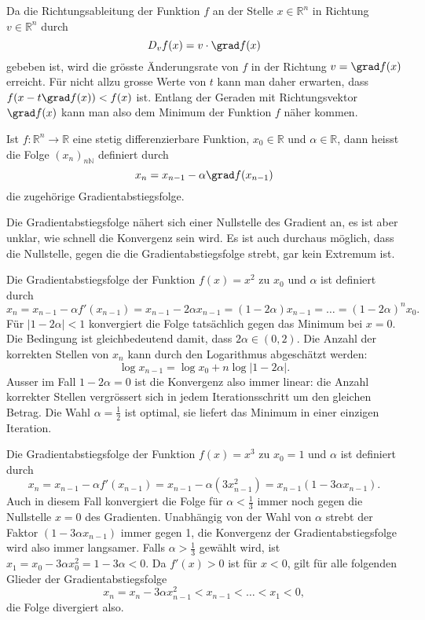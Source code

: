 Da die Richtungsableitung der Funktion $f$ an der Stelle $x\in\mathbb{R}^n$
in Richtung $v\in\mathbb{R}^n$ durch
\[
D_vf(x)
=
v\cdot \grad f(x)
\]
gebeben ist, wird die grösste Änderungsrate von $f$ in der Richtung
$v=\grad f(x)$ erreicht.
Für nicht allzu grosse Werte von $t$ kann man daher erwarten, dass
\(
f(x-t\grad f(x))
<
f(x)
\)
ist.
Entlang der Geraden mit Richtungsvektor $\grad f(x)$ kann man also
dem Minimum der Funktion $f$ näher kommen.

\begin{definition}[Gradientabstieg]
Ist $f\colon\mathbb{R}^n\to\mathbb{R}$ eine stetig differenzierbare
Funktion, $x_0\in\mathbb{R}$ und $\alpha\in\mathbb{R}$, dann heisst
die Folge $(x_n)_{n\mathbb{N}}$ definiert durch
\[
x_n = x_{n-1} - \alpha \grad f(x_{n-1})
\]
die zugehörige Gradientabstiegsfolge.
\end{definition}

Die Gradientabstiegsfolge nähert sich einer Nullstelle des Gradient
an, es ist aber unklar, wie schnell die Konvergenz sein wird.
Es ist auch durchaus möglich, dass die Nullstelle, gegen die die
Gradientabstiegsfolge strebt, gar kein Extremum ist.

\begin{beispiel}
Die Gradientabstiegsfolge der Funktion $f(x)=x^2$ zu $x_0$ und $\alpha$ ist
definiert durch
\[
x_n
=
x_{n-1}  -\alpha f'(x_{n-1})
=
x_{n-1}  -2\alpha x_{n-1}
=
(1-2\alpha)x_{n-1}
=
\dots
=
(1-2\alpha)^n x_0.
\]
Für $|1-2\alpha|< 1$ konvergiert die Folge tatsächlich gegen das
Minimum bei $x=0$.
Die Bedingung ist gleichbedeutend damit, dass $2\alpha\in(0,2)$.
Die Anzahl der korrekten Stellen von $x_n$ kann durch den
Logarithmus abgeschätzt werden:
\[
\log x_{n-1}
=
\log x_0 + n \log|1-2\alpha|.
\]
Ausser im Fall $1-2\alpha=0$ ist die Konvergenz also immer linear:
die Anzahl korrekter Stellen vergrössert sich in jedem Iterationsschritt
um den gleichen Betrag.
Die Wahl $\alpha = \frac12$ ist optimal, sie liefert das Minimum in
einer einzigen Iteration.
\end{beispiel}

\begin{beispiel}
Die Gradientabstiegsfolge der Funktion $f(x)=x^3$ zu $x_0=1$ und $\alpha$
ist definiert durch
\[
x_n
=
x_{n-1} - \alpha f'(x_{n-1})
=
x_{n-1} - \alpha (3x_{n-1}^2)
=
x_{n-1}(1-3\alpha x_{n-1}).
\]
Auch in diesem Fall konvergiert die Folge für $\alpha < \frac13$ immer
noch gegen die Nullstelle $x=0$ des Gradienten.
Unabhängig von der Wahl von $\alpha$ strebt der Faktor
$(1-3\alpha x_{n-1})$ immer gegen 1, die Konvergenz der Gradientabstiegsfolge
wird also immer langsamer.
Falls $\alpha > \frac13$ gewählt wird, ist $x_1=x_0-3\alpha x_0^2=1-3\alpha<0$.
Da $f'(x)>0$ ist für $x<0$, gilt für alle folgenden Glieder der
Gradientabstiegsfolge
\[
x_{n} = x_n-3\alpha x_{n-1}^2 < x_{n-1} < \dots < x_1 < 0,
\]
die Folge divergiert also.
\end{beispiel}

